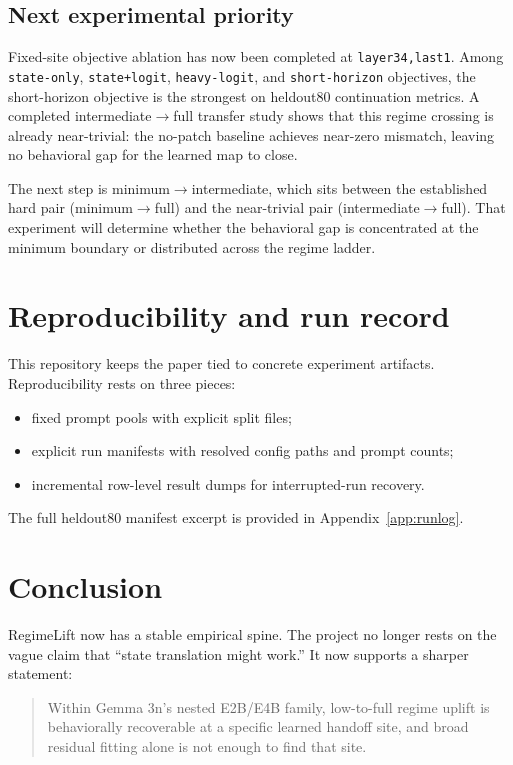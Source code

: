 \documentclass[11pt]{article}
\newcommand{\method}[1]{\texttt{#1}}
\begin{document}
\subsection{Next experimental priority}
Fixed-site objective ablation has now been completed at \method{layer34,last1}. Among \texttt{state-only}, \texttt{state+logit}, \texttt{heavy-logit}, and \texttt{short-horizon} objectives, the short-horizon objective is the strongest on heldout80 continuation metrics. A completed intermediate$\rightarrow$full transfer study shows that this regime crossing is already near-trivial: the no-patch baseline achieves near-zero mismatch, leaving no behavioral gap for the learned map to close.

The next step is minimum$\rightarrow$intermediate, which sits between the established hard pair (minimum$\rightarrow$full) and the near-trivial pair (intermediate$\rightarrow$full). That experiment will determine whether the behavioral gap is concentrated at the minimum boundary or distributed across the regime ladder.

\section{Reproducibility and run record}
This repository keeps the paper tied to concrete experiment artifacts. Reproducibility rests on three pieces:
\begin{itemize}[leftmargin=1.4em]
    \item fixed prompt pools with explicit split files;
    \item explicit run manifests with resolved config paths and prompt counts;
    \item incremental row-level result dumps for interrupted-run recovery.
\end{itemize}
The full heldout80 manifest excerpt is provided in Appendix~\ref{app:runlog}.

\section{Conclusion}
RegimeLift now has a stable empirical spine. The project no longer rests on the vague claim that ``state translation might work.'' It now supports a sharper statement:
\begin{quote}
Within Gemma 3n's nested E2B/E4B family, low-to-full regime uplift is behaviorally recoverable at a specific learned handoff site, and broad residual fitting alone is not enough to find that site.
\end{quote}
\end{document}
